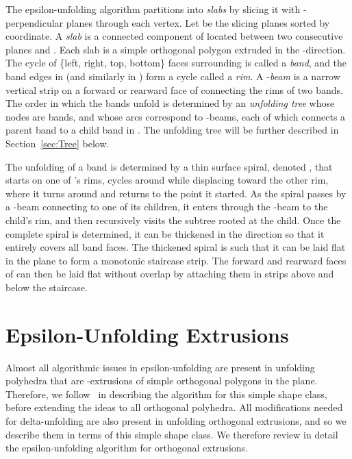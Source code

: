 \documentclass[11pt]{article}
\begin{document}
The epsilon-unfolding algorithm partitions  into \emph{slabs}
by slicing
it with -perpendicular planes through each vertex. Let 
be the slicing planes sorted by  coordinate. A \emph{slab}  is a connected component of
 located between two consecutive planes  and .
Each slab is a simple orthogonal polygon extruded in the -direction.
The cycle of
\{left, right, top, bottom\} faces surrounding  is called a \emph{band}, and
the band edges in  (and similarly in ) form a cycle called a \emph{rim}.
A -\emph{beam} is a narrow vertical strip on a forward or rearward face of 
connecting the rims of two bands.
The order in which the bands unfold is determined
by an \emph{unfolding tree}  whose nodes are bands,
and whose arcs correspond to -beams, each of which connects a
parent band to a child band in . The unfolding tree
 will be further described in Section~\ref{sec:Tree} below.

The unfolding of a band  is determined by
a thin surface spiral, denoted , that starts on one of 's rims,
cycles around  while displacing toward the other rim, where it
turns around and returns to the point
it started.  As the spiral passes by a -beam connecting  to one of its children, it enters through the -beam to the child's rim, and then recursively
visits the subtree rooted at the child.
Once the complete spiral is determined, it can be thickened in the  direction so that
it entirely covers all band faces.
The thickened spiral is such that it can be laid flat in the plane to form a
monotonic staircase strip. The forward and rearward faces of  can then be laid flat without overlap
by attaching them in strips above and below the staircase.

\section{Epsilon-Unfolding Extrusions}
\label{Epsilon-Unfolding Extrusions}

Almost all algorithmic issues in epsilon-unfolding are present in unfolding polyhedra
that are -extrusions of simple orthogonal polygons in the  plane.
Therefore, we follow~\cite{Damian-Flatland-O'Rourke-2007-epsilon} in describing
the algorithm for this simple shape class, before extending the ideas
to all orthogonal polyhedra.  All modifications needed for
delta-unfolding
are also present in unfolding orthogonal extrusions, and so we
describe them in terms of this simple shape class.
We therefore review in detail the epsilon-unfolding algorithm for orthogonal extrusions.
\end{document}
